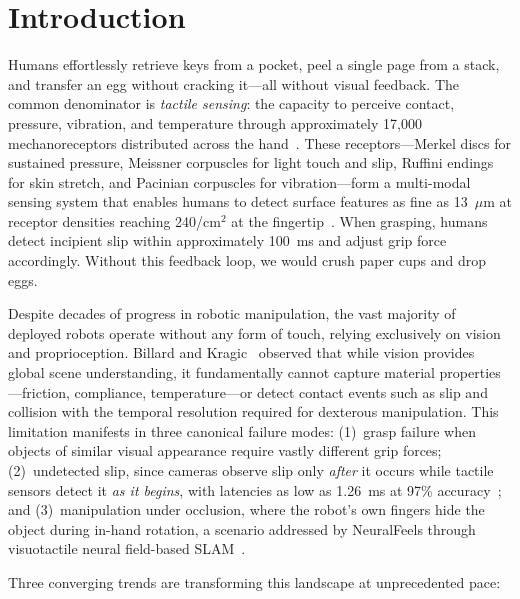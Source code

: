 \section{Introduction}
\label{sec:intro}

Humans effortlessly retrieve keys from a pocket, peel a single page from a stack, and transfer an egg without cracking it---all without visual feedback. The common denominator is \emph{tactile sensing}: the capacity to perceive contact, pressure, vibration, and temperature through approximately 17{,}000 mechanoreceptors distributed across the hand~\cite{johansson2009coding}. These receptors---Merkel discs for sustained pressure, Meissner corpuscles for light touch and slip, Ruffini endings for skin stretch, and Pacinian corpuscles for vibration---form a multi-modal sensing system that enables humans to detect surface features as fine as 13~$\mu$m at receptor densities reaching 240/cm$^2$ at the fingertip~\cite{johansson2009coding}. When grasping, humans detect incipient slip within approximately 100~ms and adjust grip force accordingly. Without this feedback loop, we would crush paper cups and drop eggs.

Despite decades of progress in robotic manipulation, the vast majority of deployed robots operate without any form of touch, relying exclusively on vision and proprioception. Billard and Kragic~\cite{billard2019trends} observed that while vision provides global scene understanding, it fundamentally cannot capture material properties---friction, compliance, temperature---or detect contact events such as slip and collision with the temporal resolution required for dexterous manipulation. This limitation manifests in three canonical failure modes: (1)~grasp failure when objects of similar visual appearance require vastly different grip forces; (2)~undetected slip, since cameras observe slip only \emph{after} it occurs while tactile sensors detect it \emph{as it begins}, with latencies as low as 1.26~ms at 97\% accuracy~\cite{zhao2025slip}; and (3)~manipulation under occlusion, where the robot's own fingers hide the object during in-hand rotation, a scenario addressed by NeuralFeels through visuotactile neural field-based SLAM~\cite{suresh2024neuralfeels}.

Three converging trends are transforming this landscape at unprecedented pace:

